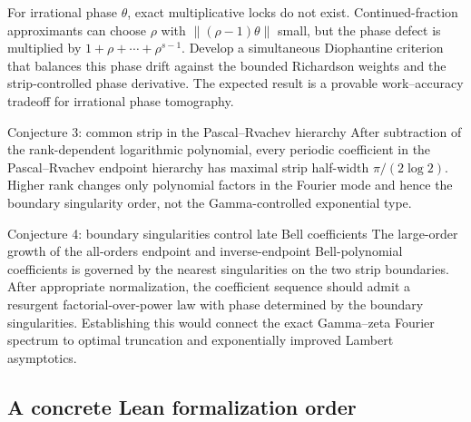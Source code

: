 \documentclass[11pt]{article}
\numberwithin{equation}{section}
\theoremstyle{definition}
\theoremstyle{remark}
\begin{document}
\begin{problem}
For irrational phase $\theta$, exact multiplicative locks do not exist.  Continued-fraction
approximants can choose $\rho$ with $\|(\rho-1)\theta\|$ small, but the phase defect is
multiplied by $1+\rho+\cdots+\rho^{s-1}$.  Develop a simultaneous Diophantine criterion that
balances this phase drift against the bounded Richardson weights and the strip-controlled
phase derivative.  The expected result is a provable work--accuracy tradeoff for irrational
phase tomography.
\end{problem}

\begin{conjecturebox}{Conjecture 3: common strip in the Pascal--Rvachev hierarchy}
After subtraction of the rank-dependent logarithmic polynomial, every periodic coefficient
in the Pascal--Rvachev endpoint hierarchy has maximal strip half-width
$\pi/(2\log2)$.  Higher rank changes only polynomial factors in the Fourier mode and hence
the boundary singularity order, not the Gamma-controlled exponential type.
\end{conjecturebox}

\begin{conjecturebox}{Conjecture 4: boundary singularities control late Bell coefficients}
The large-order growth of the all-orders endpoint and inverse-endpoint Bell-polynomial
coefficients is governed by the nearest singularities on the two strip boundaries.  After
appropriate normalization, the coefficient sequence should admit a resurgent
factorial-over-power law with phase determined by the boundary singularities.  Establishing
this would connect the exact Gamma--zeta Fourier spectrum to optimal truncation and
exponentially improved Lambert asymptotics.
\end{conjecturebox}

\subsection{A concrete Lean formalization order}
\end{document}
